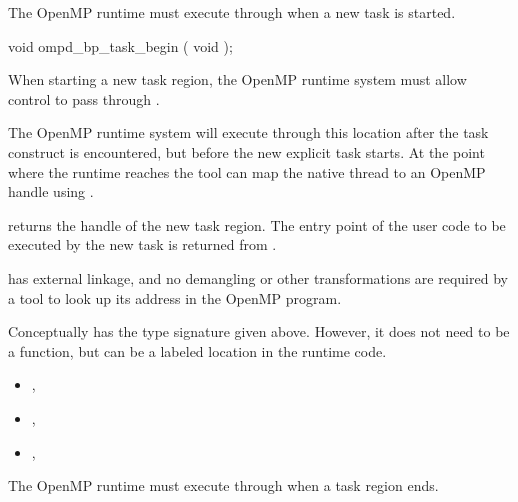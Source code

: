\label{ompd:ompd_bp_task_begin}

The OpenMP runtime must execute through 
when a new task is started.


\begin{cspecific}
\begin{ompSyntax}
void ompd_bp_task_begin ( void );
\end{ompSyntax}
\end{cspecific}


\descr

When starting a new task region, the OpenMP runtime system
must allow control to pass through .

The OpenMP runtime system will execute through this location after the task
construct is encountered, but before the new explicit task starts.
At the point where the runtime reaches 
the tool can map the native thread to an OpenMP handle using
.

 returns the handle of the new task region.
The entry point of the user code to be executed by the new task
is returned from
.

\restrictions

 has external  linkage, and no
demangling or other transformations are required by a tool
to look up its address in the OpenMP program.

Conceptually  has the type signature
given above.
However, it does not need to be a function, but can be a labeled location
in the runtime code.

\crossreferences
\begin{itemize}
\item
  , 
\item
  , 
\item
  , 
\end{itemize}

\label{ompd:ompd_bp_task_end}

\summary
The OpenMP runtime must execute through 
when a task region ends.


